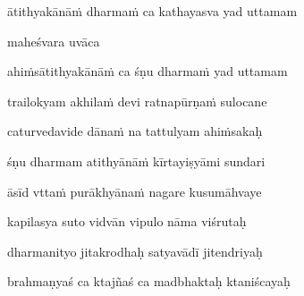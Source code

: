 ātithyakānāṁ dharmaṁ ca kathayasva yad uttamam \veg\dontdisplaylinenum
{}

maheśvara uvāca~{\dandab}\dontdisplaylinenum 
{}

ahiṁsātithyakānāṁ ca śṇu dharmaṁ yad uttamam\thinspace{\danda} \dontdisplaylinenum
{}

trailokyam akhilaṁ devi ratnapūrṇaṁ sulocane \veg\dontdisplaylinenum
{}

caturvedavide dānaṁ na tattulyam ahiṁsakaḥ\thinspace{\dandab} \dontdisplaylinenum
{}

śṇu dharmam atithyānāṁ kīrtayiṣyāmi sundari \veg\dontdisplaylinenum


āsīd vttaṁ purākhyānaṁ nagare kusumāhvaye\thinspace{\dandab} \dontdisplaylinenum
{}

kapilasya suto vidvān vipulo nāma viśrutaḥ \veg\dontdisplaylinenum

dharmanityo jitakrodhaḥ satyavādī jitendriyaḥ\thinspace{\dandab} \dontdisplaylinenum

brahmaṇyaś ca ktajñaś ca madbhaktaḥ ktaniścayaḥ \veg\dontdisplaylinenum
{}

